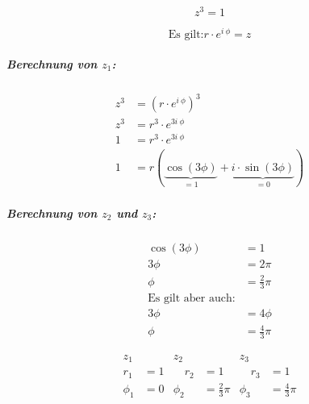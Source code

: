 \begin{uebung}
	\begin{aufgabe}
		\[
			z^3 = 1
		\]
	\end{aufgabe}
	\begin{loesungsweg}
		\[
			\text{Es gilt:}
			r \cdot e^{i\ \phi} = z
		\]

		\subparagraph{Berechnung von \(z_1\):}


		\begin{align*}
			z^3 & = {\left(r \cdot e^{i\ \phi}\right)}^3                                           \\
			z^3 & = r^3 \cdot e^{3 i\ \phi}                                                        \\
			1   & = r^3 \cdot e^{3 i\ \phi}                                                        \\
			1   & = r(\underbrace{\cos{(3 \phi)}}_{=1} + \underbrace{i \cdot \sin{(3 \phi)}}_{=0})
		\end{align*}

		\subparagraph{Berechnung von \(z_2\) und \(z_3\):}

		\[
			\begin{alignedat}{1}
				\cos{(3 \phi)} &= 1 \\
				3 \phi &= 2 \pi \\
				\phi &= \frac{2}{3} \pi \\
				\text{Es gilt aber auch:} \\
				3 \phi &= 4 \phi \\
				\phi &= \frac{4}{3} \pi
			\end{alignedat}
		\]
	\end{loesungsweg}

	\begin{loesung}
		\[
			\begin{alignedat}{3}
				z_1    &     & z_2       &                   & z_3       &                   \\
				r_1    & = 1 & \quad r_2 & = 1               & \quad r_3 & = 1               \\
				\phi_1 & = 0 & \phi_2    & = \frac{2}{3} \pi & \phi_3    & = \frac{4}{3} \pi
			\end{alignedat}
		\]
	\end{loesung}
\end{uebung}
